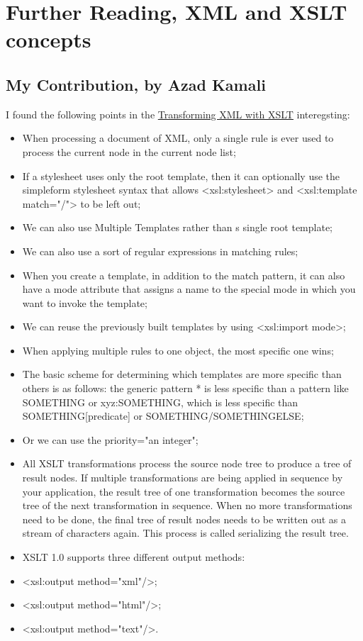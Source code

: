 
%
\section{Further Reading, XML and XSLT concepts}
\label{sect:azad}
\subsection{My Contribution, by Azad Kamali}
	I found the following points in the \href{http://oreilly.com/catalog/orxmlapp/chapter/ch07.pdf}{Transforming XML with XSLT} interegsting:
        \begin{itemize}
		\item When processing a document of XML, only a single rule is ever used to process the current node in the current node list;
		\item If a stylesheet uses only the root template, then it can optionally use the simpleform stylesheet syntax that allows <xsl:stylesheet> and <xsl:template match="/"> to be left out;
		\item We can also use Multiple Templates rather than s single root template;
		\item We can also use a sort of regular expressions in matching rules;
		\item When you create a template, in addition to the match pattern, it can also have a mode attribute that assigns a name to the special mode in which you want to invoke the template;
		\item We can reuse the previously built templates by using <xsl:import mode>;
		\item When applying multiple rules to one object, the most specific one wins;
		\item The basic scheme for determining which templates are more specific than others is as follows: the generic pattern * is less specific than a pattern like SOMETHING or xyz:SOMETHING, which is less specific than SOMETHING[predicate] or SOMETHING/SOMETHINGELSE;
		\item Or we can use the priority="an integer";
		\item All XSLT transformations process the source node tree to produce a tree of result nodes. If multiple transformations are being applied in sequence by your application, the result tree of one transformation becomes the source tree of the next transformation in sequence. When no more transformations need to be done, the final tree of result nodes needs to be written out as a stream of characters again. This process is called serializing the result tree.
		\item XSLT 1.0 supports three different output methods:
		\item  <xsl:output method="xml"/>;
		\item <xsl:output method="html"/>;
		\item <xsl:output method="text"/>.
        \end{itemize}
